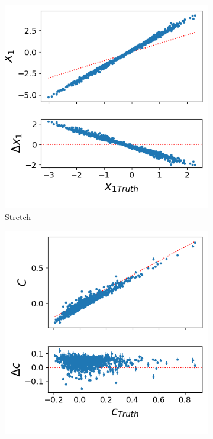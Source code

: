 \documentclass{book}
\begin{document}
\begin{figure}[h]
\begin{subfigure}{0.45\textwidth}
		\includegraphics[width=\textwidth]{figures/nacl_x1.png}
		\caption{Stretch}
		\label{fig:nacl_x1}
	\end{subfigure}
	\hfill
	\begin{subfigure}{0.45\textwidth}
		\centering
		\includegraphics[width=\textwidth]{figures/nacl_c.png}

\end{subfigure}
\end{figure}
\end{document}

